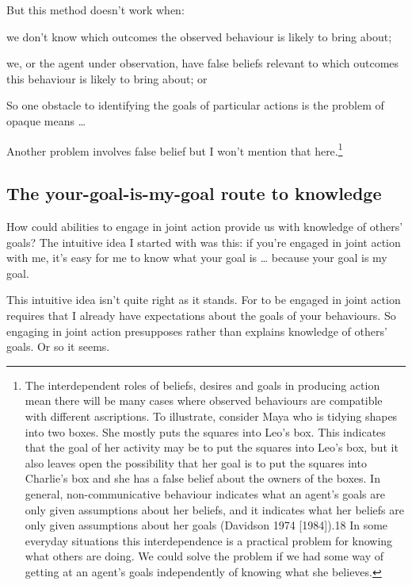 \documentclass[12pt,a4paper]{extarticle}
\begin{document}
But this method doesn’t work when: 
%
\begin{list}{*}{}
\item we don’t know which outcomes the observed behaviour is likely to bring about;
\item we, or the agent under observation, have false beliefs relevant to which outcomes this behaviour is likely to bring about; or
\end{list}
%
So one obstacle to identifying the goals of particular actions is the problem of opaque means …

Another problem involves false belief but I won't mention that here.\footnote{
 The interdependent roles of beliefs, desires and goals in producing action mean there will be many cases where observed behaviours are compatible with different ascriptions. To illustrate, consider Maya who is tidying shapes into two boxes. She mostly puts the squares into Leo’s box.
This indicates that the goal of her activity may be to put the squares into Leo’s box, but it also leaves open the possibility that her goal is to put the squares into Charlie’s box and she has a false belief about the owners of the boxes. In general, non-communicative behaviour indicates what an agent’s goals are only given assumptions about her beliefs, and it indicates what her beliefs are only given assumptions about her goals (Davidson 1974 [1984]).18	In some everyday situations this interdependence is a practical problem for knowing what others are doing. We could solve the problem if we had some way of getting at an agent’s goals independently of knowing what she believes.
 }

\subsection{The your-goal-is-my-goal route to knowledge}

How could abilities to engage in joint action provide us with knowledge of others’ goals?   The intuitive idea I started with was this: if you’re engaged in joint action with me, it’s easy for me to know what your goal is … because your goal is my goal.  

This intuitive idea isn’t quite right as it stands.  For to be engaged in joint action requires that I already have expectations about the goals of your behaviours.  
So engaging in joint action presupposes rather than explains knowledge of others’ goals.  Or so it seems.
\end{document}

